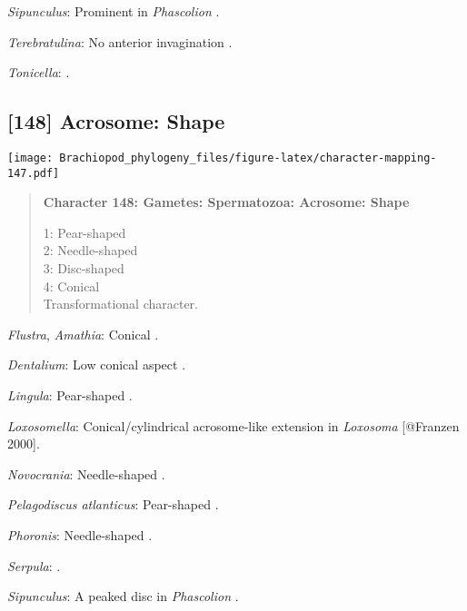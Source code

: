 \documentclass[openany]{book}
\theoremstyle{definition}
\theoremstyle{definition}
\theoremstyle{definition}
\theoremstyle{remark}
\begin{document}
\hypertarget{Sipunculus-coding-147}{}
\emph{Sipunculus}: Prominent in \emph{Phascolion} \citep{Rice1993}.

\hypertarget{Terebratulina-coding-147}{}
\emph{Terebratulina}: No anterior invagination
\citep{Hodgson1994Ultrastructureof}.

\hypertarget{Tonicella-coding-147}{}
\emph{Tonicella}: \citet{BucklandNicks1988}.

\subsection*{{[}148{]} Acrosome: Shape}\label{acrosome-shape}

\texttt{[image: Brachiopod\_phylogeny\_files/figure-latex/character-mapping-147.pdf]}

\begin{quote}
\textbf{Character 148: Gametes: Spermatozoa: Acrosome: Shape}

1: Pear-shaped\\
2: Needle-shaped\\
3: Disc-shaped\\
4: Conical\\
Transformational character.
\end{quote}

\hypertarget{Amathia-coding-148}{}
\emph{Flustra}, \emph{Amathia}: Conical \citep[in
\emph{Tubulipora};][]{Franzen1984}.

\hypertarget{Dentalium-coding-148}{}
\emph{Dentalium}: Low conical aspect \citep{DufresneDube1983}.

\hypertarget{Lingula-coding-148}{}
\emph{Lingula}: Pear-shaped \citep{Fukumoto2003Theacrosome}.

\hypertarget{Loxosomella-coding-148}{}
\emph{Loxosomella}: Conical/cylindrical acrosome-like extension in
\emph{Loxosoma} {[}@Franzen 2000{]}.

\hypertarget{Novocrania-coding-148}{}
\emph{Novocrania}: Needle-shaped \citep{Afzelius1978Finestructure}.

\hypertarget{Pelagodiscus_atlanticus-coding-148}{}
\emph{Pelagodiscus atlanticus}: Pear-shaped
\citep{Hodgson1994Ultrastructureof}.

\hypertarget{Phoronis-coding-148}{}
\emph{Phoronis}: Needle-shaped \citep{Reunov2004Ultrastructuralstudy}.

\hypertarget{Serpula-coding-148}{}
\emph{Serpula}: \citet{Gherardi2011}.

\hypertarget{Sipunculus-coding-148}{}
\emph{Sipunculus}: A peaked disc in \emph{Phascolion} \citep{Rice1993}.
\end{document}
